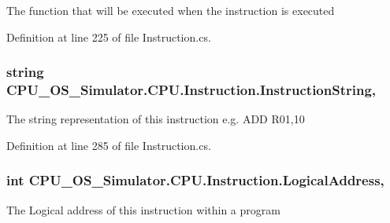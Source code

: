 The function that will be executed when the instruction is executed 



Definition at line 225 of file Instruction.\+cs.

\hypertarget{class_c_p_u___o_s___simulator_1_1_c_p_u_1_1_instruction_a2750b111d827f6e6a8fccd0e8520de89}{}
\subsubsection[{Instruction\+String}]{\setlength{\rightskip}{0pt plus 5cm}string C\+P\+U\+\_\+\+O\+S\+\_\+\+Simulator.\+C\+P\+U.\+Instruction.\+Instruction\+String\hspace{0.3cm}{\ttfamily [get]}, {\ttfamily [set]}}\label{class_c_p_u___o_s___simulator_1_1_c_p_u_1_1_instruction_a2750b111d827f6e6a8fccd0e8520de89}


The string representation of this instruction e.\+g. A\+D\+D R01,10 



Definition at line 285 of file Instruction.\+cs.

\hypertarget{class_c_p_u___o_s___simulator_1_1_c_p_u_1_1_instruction_abfc23dbc9a978d2a1468b819f87a7614}{}
\subsubsection[{Logical\+Address}]{\setlength{\rightskip}{0pt plus 5cm}int C\+P\+U\+\_\+\+O\+S\+\_\+\+Simulator.\+C\+P\+U.\+Instruction.\+Logical\+Address\hspace{0.3cm}{\ttfamily [get]}, {\ttfamily [set]}}\label{class_c_p_u___o_s___simulator_1_1_c_p_u_1_1_instruction_abfc23dbc9a978d2a1468b819f87a7614}


The Logical address of this instruction within a program 



